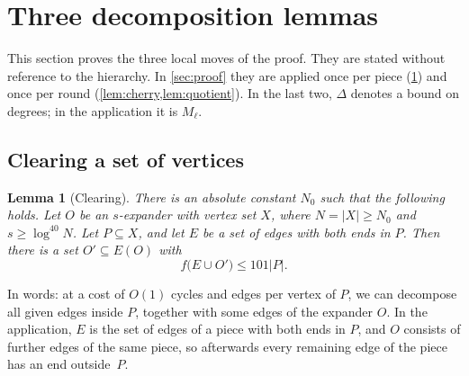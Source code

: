 \documentclass[11pt]{article}
\newtheorem{lemma}[theorem]{Lemma}
\theoremstyle{definition}
\theoremstyle{remark}
\numberwithin{equation}{section}
\numberwithin{figure}{section}
\numberwithin{table}{section}
\begin{document}
\section{Three decomposition lemmas}\label{sec:three}

This section proves the three local moves of the proof. They are stated without
reference to the hierarchy. In \cref{sec:proof} they are applied once per piece
(\cref{lem:clear}) and once per round (\cref{lem:cherry,lem:quotient}). In the
last two, $\Delta$ denotes a bound on degrees; in the application it is
$M_\ell$.

\subsection{Clearing a set of vertices}

\begin{lemma}[Clearing]\label{lem:clear}
There is an absolute constant $N_0$ such that the following holds. Let $O$ be
an $s$-expander with vertex set $X$, where $N=|X|\ge N_0$ and
$s\ge\log^{40}N$. Let $P\subseteq X$, and let $E$ be a set of edges with both
ends in $P$. Then there is a set $O'\subseteq E(O)$ with
\[
f\bigl(E\cup O'\bigr)\le101|P|.
\]
\end{lemma}

In words: at a cost of $O(1)$ cycles and edges per vertex of $P$, we can
decompose all given edges inside $P$, together with some edges of the expander
$O$. In the application, $E$ is the set of edges of a piece with both ends in
$P$, and $O$ consists of further edges of the same piece, so afterwards every
remaining edge of the piece has an end outside~$P$.
\end{document}
